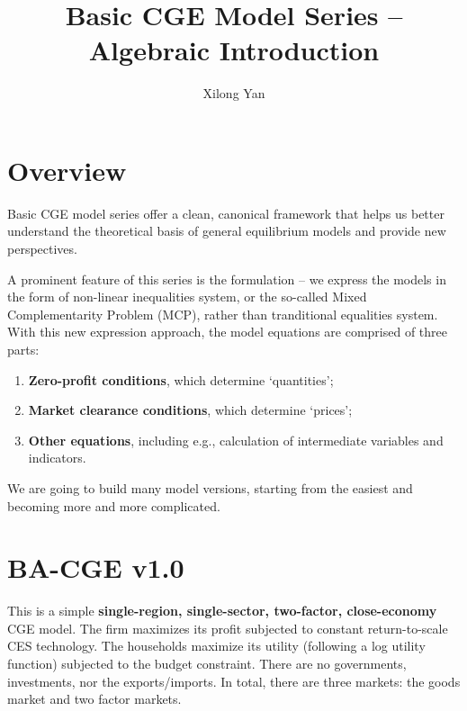 \documentclass[12pt, a4paper]{article}
\title{Basic CGE Model Series -- Algebraic Introduction}
\author{Xilong Yan}
\numberwithin{equation}{section}
\numberwithin{figure}{section}
\numberwithin{table}{section}
\begin{document}
\begin{titlingpage}
\maketitle
\end{titlingpage}

\setcounter{section}{-1}
\section{Overview} \label{Overview}
Basic CGE model series offer a clean, canonical framework that helps us better understand
the theoretical basis of general equilibrium models and provide new perspectives. 

A prominent feature of this series is the formulation -- 
we express the models in the form of non-linear inequalities system, or the so-called Mixed Complementarity Problem (MCP), 
rather than tranditional equalities system. 
With this new expression approach, the model equations are comprised of three parts: 
\begin{enumerate}
	\item \textbf{Zero-profit conditions}, which determine ‘quantities’; 
	\item	\textbf{Market clearance conditions}, which determine ‘prices’; 
	\item \textbf{Other equations}, including e.g., calculation of intermediate variables and indicators. 
\end{enumerate}

We are going to build many model versions, 
starting from the easiest and becoming more and more complicated. 

\clearpage

\section{BA-CGE v1.0} \label{BA-CGE v1.0}
This is a simple \textbf{single-region, single-sector, two-factor, close-economy} CGE model. 
The firm maximizes its profit subjected to constant return-to-scale CES technology. 
The households maximize its utility (following a log utility function) subjected to the budget constraint. 
There are no governments, investments, nor the exports/imports. 
In total, there are three markets: the goods market and two factor markets. 
\end{document}
